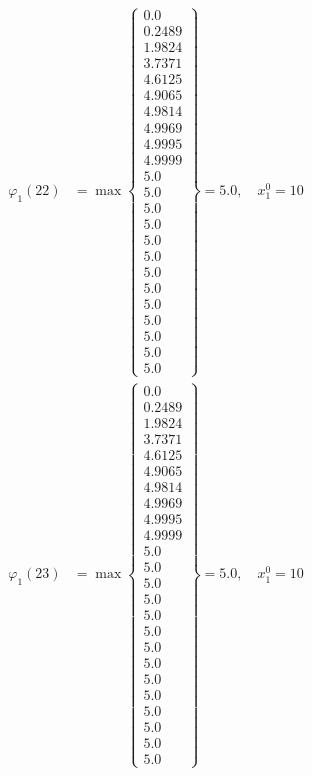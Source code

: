 \documentclass{article}
\begin{document}
\begin{align*}
  
\varphi_{1}(22) &= \max \left\{ \begin{array}{c}
0.0 \\
 0.2489 \\
 1.9824 \\
 3.7371 \\
 4.6125 \\
 4.9065 \\
 4.9814 \\
 4.9969 \\
 4.9995 \\
 4.9999 \\
 5.0 \\
 5.0 \\
 5.0 \\
 5.0 \\
 5.0 \\
 5.0 \\
 5.0 \\
 5.0 \\
 5.0 \\
 5.0 \\
 5.0 \\
 5.0 \\
 5.0
\end{array} \right\}=5.0,\quad x_{1}^0=10\\
  
  
  
  
\varphi_{1}(23) &= \max \left\{ \begin{array}{c}
0.0 \\
 0.2489 \\
 1.9824 \\
 3.7371 \\
 4.6125 \\
 4.9065 \\
 4.9814 \\
 4.9969 \\
 4.9995 \\
 4.9999 \\
 5.0 \\
 5.0 \\
 5.0 \\
 5.0 \\
 5.0 \\
 5.0 \\
 5.0 \\
 5.0 \\
 5.0 \\
 5.0 \\
 5.0 \\
 5.0 \\
 5.0 \\
 5.0
\end{array} \right\}=5.0,\quad x_{1}^0=10\\
  

\end{align*}
\end{document}
